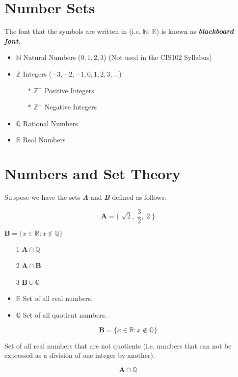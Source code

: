 \section{Number Sets}
 The font that the symbols are written in (i.e. $\mathbb{N}$, $\mathbb{R}$) is known as \textit{\textbf{blackboard font}}.
\begin{itemize}
 \item $\mathbb{N}$ Natural Numbers ($0,1,2,3$) 
(Not used in the CIS102 Syllabus)
\item $\mathbb{Z}$ Integers ($-3,-2,-1,0,1,2,3, \ldots$)
\begin{itemize}
\item[$\ast$] $\mathbb{Z}^{+}$ Positive Integers
\item[$\ast$] $\mathbb{Z}^{-}$ Negative Integers
\end{itemize}
\item $\mathbb{Q}$ Rational Numbers
\item $\mathbb{R}$ Real Numbers
\end{itemize}

\section{Numbers and Set Theory}

Suppose we have the sets \textit{\textbf{A}} and \textbf{\textit{B}} defined as follows:

\[ \boldsymbol{A} = \{\; \sqrt{2},\; \frac{3}{2},\; 2\; \}\]
\begin{center}
$ \boldsymbol{B} = \{ x \in \mathbb{R} :  x \notin  \mathbb{Q} \}  $
\end{center}

\begin{itemize}
\item[1] $\boldsymbol{A} \cap \mathbb{Q}$
\item[2] $\boldsymbol{A} \cap \boldsymbol{B}$
\item[3] $\boldsymbol{B} \cup \mathbb{Q}$
\end{itemize}



\begin{itemize}
\item $ \mathbb{R}$ Set of all real numbers.
\item $ \mathbb{Q}$ Set of all quotient numbers.
\end{itemize}

\[ \boldsymbol{B} = \{ x \in \mathbb{R} :  x \notin  \mathbb{Q} \}\]  

Set of all real numbers that are not quotients (i.e. numbers that can not be expressed as a division of one integer by another).





\[\boldsymbol{A} \cap \mathbb{Q}\]

